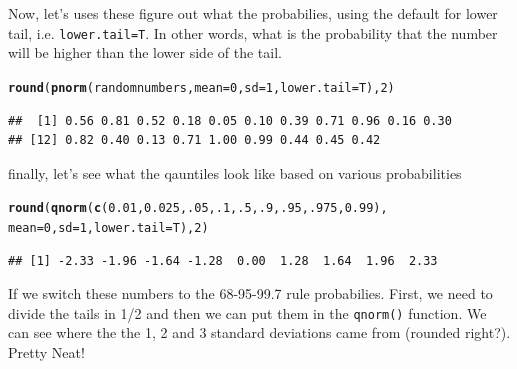 \documentclass{tufte-handout}\usepackage[]{graphicx}\usepackage[]{color}
\makeatletter
\newcommand{\hlnum}[1]{\textcolor[rgb]{0.686,0.059,0.569}{#1}}%
\newcommand{\hlstd}[1]{\textcolor[rgb]{0.345,0.345,0.345}{#1}}%
\newcommand{\hlkwc}[1]{\textcolor[rgb]{0.333,0.667,0.333}{#1}}%
\newcommand{\hlkwd}[1]{\textcolor[rgb]{0.737,0.353,0.396}{\textbf{#1}}}%
\newenvironment{kframe}{%
 \def\at@end@of@kframe{}%
 \ifinner\ifhmode%
  \def\at@end@of@kframe{\end{minipage}}%
  \begin{minipage}{\columnwidth}%
 \fi\fi%
 \def\FrameCommand##1{\hskip\@totalleftmargin \hskip-\fboxsep
 \colorbox{shadecolor}{##1}\hskip-\fboxsep
     \hskip-\linewidth \hskip-\@totalleftmargin \hskip\columnwidth}%
 \MakeFramed {\advance\hsize-\width
   \@totalleftmargin\z@ \linewidth\hsize
   \@setminipage}}%
 {\par\unskip\endMakeFramed%
 \at@end@of@kframe}
\newenvironment{knitrout}{}{} %
\makeatother
\begin{document}
Now, let's uses these figure out what the probabilies, using the default for lower tail, i.e. \texttt{lower.tail=T}. In other words, what is the probability that the number will be higher than the lower side of the tail. 

\begin{knitrout}
\color{fgcolor}\begin{kframe}
\begin{alltt}
\hlkwd{round}\hlstd{(}\hlkwd{pnorm}\hlstd{(randomnumbers,} \hlkwc{mean}\hlstd{=}\hlnum{0}\hlstd{,} \hlkwc{sd}\hlstd{=}\hlnum{1}\hlstd{,} \hlkwc{lower.tail}\hlstd{=T),} \hlnum{2}\hlstd{)}
\end{alltt}
\begin{verbatim}
##  [1] 0.56 0.81 0.52 0.18 0.05 0.10 0.39 0.71 0.96 0.16 0.30
## [12] 0.82 0.40 0.13 0.71 1.00 0.99 0.44 0.45 0.42
\end{verbatim}
\end{kframe}
\end{knitrout}

finally, let's see what the qauntiles look like based on various probabilities

\begin{knitrout}
\color{fgcolor}\begin{kframe}
\begin{alltt}
\hlkwd{round}\hlstd{(}\hlkwd{qnorm}\hlstd{(}\hlkwd{c}\hlstd{(}\hlnum{0.01}\hlstd{,} \hlnum{0.025}\hlstd{,} \hlnum{.05}\hlstd{,} \hlnum{.1}\hlstd{,} \hlnum{.5}\hlstd{,} \hlnum{.9}\hlstd{,} \hlnum{.95}\hlstd{,} \hlnum{.975}\hlstd{,} \hlnum{0.99}\hlstd{),}
            \hlkwc{mean}\hlstd{=}\hlnum{0}\hlstd{,} \hlkwc{sd}\hlstd{=}\hlnum{1}\hlstd{,} \hlkwc{lower.tail}\hlstd{=T),} \hlnum{2}\hlstd{)}
\end{alltt}
\begin{verbatim}
## [1] -2.33 -1.96 -1.64 -1.28  0.00  1.28  1.64  1.96  2.33
\end{verbatim}
\end{kframe}
\end{knitrout}

If we switch these numbers to the 68-95-99.7 rule probabilies. First, we need to divide the tails in 1/2 and then we can put them in the \texttt{qnorm()} function. We can see where the the 1, 2 and 3 standard deviations came from (rounded right?). Pretty Neat!
\end{document}

